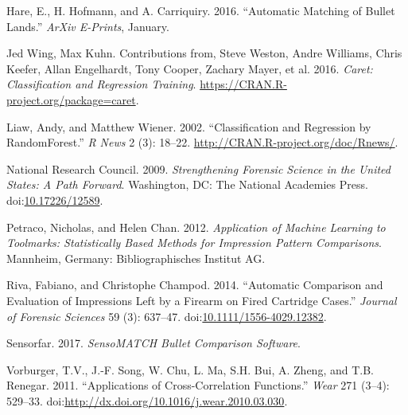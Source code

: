 \documentclass[12pt,]{article}
\theoremstyle{definition}
\theoremstyle{definition}
\theoremstyle{definition}
\theoremstyle{remark}
\begin{document}
\hypertarget{ref-2016arXiv160105788H}{}
Hare, E., H. Hofmann, and A. Carriquiry. 2016. ``Automatic Matching of
Bullet Lands.'' \emph{ArXiv E-Prints}, January.

\hypertarget{ref-caretpkg}{}
Jed Wing, Max Kuhn. Contributions from, Steve Weston, Andre Williams,
Chris Keefer, Allan Engelhardt, Tony Cooper, Zachary Mayer, et al. 2016.
\emph{Caret: Classification and Regression Training}.
\url{https://CRAN.R-project.org/package=caret}.

\hypertarget{ref-randomForest}{}
Liaw, Andy, and Matthew Wiener. 2002. ``Classification and Regression by
RandomForest.'' \emph{R News} 2 (3): 18--22.
\url{http://CRAN.R-project.org/doc/Rnews/}.

\hypertarget{ref-NAS:2009}{}
National Research Council. 2009. \emph{Strengthening Forensic Science in
the United States: A Path Forward}. Washington, DC: The National
Academies Press.
doi:\href{https://doi.org/10.17226/12589}{10.17226/12589}.

\hypertarget{ref-petraco:2012}{}
Petraco, Nicholas, and Helen Chan. 2012. \emph{Application of Machine
Learning to Toolmarks: Statistically Based Methods for Impression
Pattern Comparisons}. Mannheim, Germany: Bibliographisches Institut AG.

\hypertarget{ref-riva:2014}{}
Riva, Fabiano, and Christophe Champod. 2014. ``Automatic Comparison and
Evaluation of Impressions Left by a Firearm on Fired Cartridge Cases.''
\emph{Journal of Forensic Sciences} 59 (3): 637--47.
doi:\href{https://doi.org/10.1111/1556-4029.12382}{10.1111/1556-4029.12382}.

\hypertarget{ref-sensorfar}{}
Sensorfar. 2017. \emph{SensoMATCH Bullet Comparison Software}.

\hypertarget{ref-vorburger:2011}{}
Vorburger, T.V., J.-F. Song, W. Chu, L. Ma, S.H. Bui, A. Zheng, and T.B.
Renegar. 2011. ``Applications of Cross-Correlation Functions.''
\emph{Wear} 271 (3--4): 529--33.
doi:\href{https://doi.org/http://dx.doi.org/10.1016/j.wear.2010.03.030}{http://dx.doi.org/10.1016/j.wear.2010.03.030}.
\end{document}
